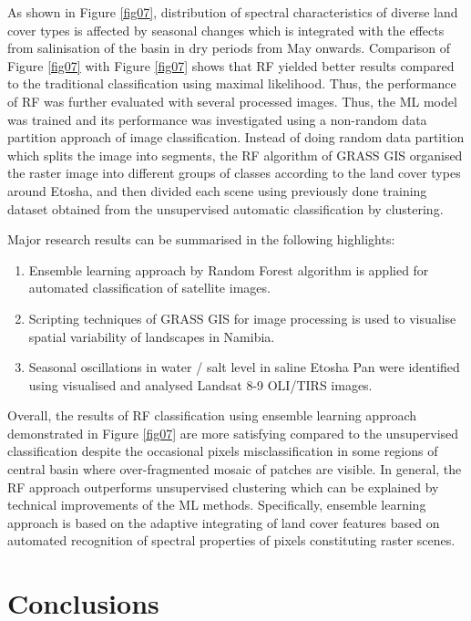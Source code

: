 \documentclass[climate,article,submit,pdftex,moreauthors]{Definitions/mdpi}
\begin{document}
As shown in Figure \ref{fig07}, distribution of spectral characteristics of diverse land cover types is affected by seasonal changes which is integrated with the effects from salinisation of the basin in dry periods from May onwards. Comparison of Figure  \ref{fig07} with Figure \ref{fig07} shows that RF yielded better results compared to the traditional classification using maximal likelihood. Thus, the performance of RF was further evaluated with several processed images. Thus, the ML model was trained and its performance was investigated using a non-random data partition approach of image classification. Instead of doing random data partition which splits the image into segments, the RF algorithm of GRASS GIS organised the raster image into different groups of classes according to the land cover types around Etosha, and then divided each scene using previously done training dataset obtained from the unsupervised automatic classification by clustering.

Major research results can be summarised in the following highlights: 
\begin{enumerate}
\item Ensemble learning approach by Random Forest algorithm is applied for automated classification of satellite images. 
\item Scripting techniques of GRASS GIS for image processing is used to visualise spatial variability of landscapes in Namibia.
\item Seasonal oscillations in water / salt level in saline Etosha Pan were identified using visualised and analysed Landsat 8-9 OLI/TIRS images.
\end{enumerate}

Overall, the results of RF classification using ensemble learning approach demonstrated in Figure \ref{fig07} are more satisfying compared to the unsupervised classification despite the occasional pixels misclassification in some regions of central basin where over-fragmented mosaic of patches are visible. In general, the RF approach outperforms unsupervised clustering which can be explained by technical improvements of the ML methods. Specifically, ensemble learning approach is based on the adaptive integrating of land cover features based on automated recognition of spectral properties of pixels constituting raster scenes. 

\section{Conclusions}
\end{document}
